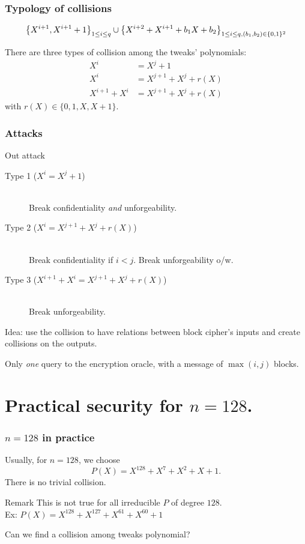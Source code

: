 \documentclass{beamer}
\begin{document}
	\begin{frame}
		\frametitle{Typology of collisions}
		
		\[
				\left\{X^{i+1}, X^{i+1} +1 \right\}_{1\leq i \leq q} \cup \left\{ X^{i+2} + X^{i+1} + b_1 X + b_2\right\}_{1\leq i \leq q, (b_1,b_2) \in \{0, 1\}^2}
		\]
		
		\vspace{0.5cm}
		There are three types of collision among the tweaks' polynomials:
		\begin{align}
			X^i &= X^j + 1 \\
			X^i & = X^{j+1} + X^j + r(X) \\
			X^{i+1} + X^i & = X^{j+1} + X^j + r(X)
		\end{align}
		with $r(X) \in \{0, 1, X, X+1\}$.
	
	\end{frame}

	\begin{frame}
		\frametitle{Attacks}

		\begin{block}{Out attack}
		\begin{description}
			\item[Type 1 ($X^i = X^j + 1$)] \ \\
			Break confidentiality \emph{and} unforgeability.   
			\item[Type 2 ($X^i  = X^{j+1} + X^j + r(X)$)] \ \\ Break confidentiality if $i < j$. Break unforgeability o/w.   
			\item[Type 3 ($X^{i+1} + X^i  = X^{j+1} + X^j + r(X)$)]  \ \\
			Break unforgeability.   
		\end{description}
		\end{block}

		Idea: use the collision to have relations between block cipher's inputs and create collisions on the outputs.
		
		Only \emph{one} query to the encryption oracle, with a message of $\max(i,j)$ blocks.
	\end{frame}



\section{Practical security for $n = 128$.} %
\label{sec:practical_security_for_n_128}


	\begin{frame}
		\frametitle{$n = 128$ in practice}

		Usually, for $n = 128$, we choose
		\[
			P(X) = X^{128}+X^{7}+X^{2}+X+1.
		\]
		There is no trivial collision. 
		\begin{block}{Remark}
			This is not true for all irreducible $P$ of degree $128$.\\
			Ex: $P(X)=X^{128}+X^{127}+X^{61}+X^{60}+1$
		\end{block}
		
		Can we find a collision among tweaks polynomial?
	\end{frame}
\end{document}
